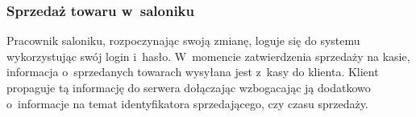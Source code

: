 \subsubsection{Sprzedaż towaru w~saloniku}
Pracownik saloniku, rozpoczynając swoją zmianę, loguje się do systemu wykorzystując swój login i~hasło. W~momencie zatwierdzenia sprzedaży na kasie, informacja o~sprzedanych towarach wysyłana jest z~kasy do klienta. Klient propaguje tą informację do serwera dołączając wzbogacając ją dodatkowo o~informacje na temat identyfikatora sprzedającego, czy czasu sprzedaży.